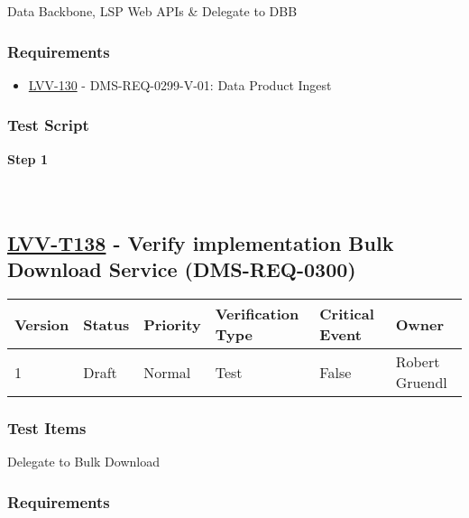 Data Backbone, LSP Web APIs \& Delegate to DBB

\hypertarget{requirements-114}{%
\subsubsection{Requirements}\label{requirements-114}}

\begin{itemize}
\tightlist
\item
  \href{https://jira.lsstcorp.org/browse/LVV-130}{LVV-130} -
  DMS-REQ-0299-V-01: Data Product Ingest
\end{itemize}

\hypertarget{test-script-114}{%
\subsubsection{Test Script}\label{test-script-114}}

\textbf{Step 1}\\
~\\
~\\

\hypertarget{lvv-t138---verify-implementation-bulk-download-service-dms-req-0300}{%
\subsection{\texorpdfstring{\href{https://jira.lsstcorp.org/secure/Tests.jspa\#/testCase/LVV-T138}{LVV-T138}
- Verify implementation Bulk Download Service
(DMS-REQ-0300)}{LVV-T138 - Verify implementation Bulk Download Service (DMS-REQ-0300)}}\label{lvv-t138---verify-implementation-bulk-download-service-dms-req-0300}}

\begin{longtable}[]{@{}llllll@{}}
\toprule
Version & Status & Priority & Verification Type & Critical Event &
Owner\tabularnewline
\midrule
\endhead
1 & Draft & Normal & Test & False & Robert Gruendl\tabularnewline
\bottomrule
\end{longtable}

\hypertarget{test-items-114}{%
\subsubsection{Test Items}\label{test-items-114}}

Delegate to Bulk Download

\hypertarget{requirements-115}{%
\subsubsection{Requirements}\label{requirements-115}}

